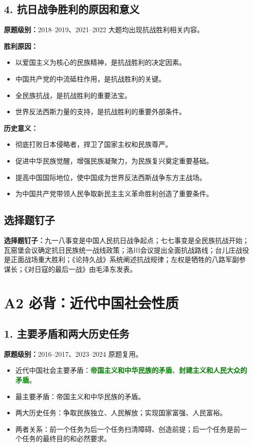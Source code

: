\documentclass[UTF8,zihao=-4]{ctexart}
\newcommand{\exam}[1]{\textcolor{accent}{\bfseries 原题级别：}#1}
\newcommand{\pin}[1]{\textcolor{main}{\bfseries 选择题钉子：}#1}
\newcommand{\core}[1]{\textcolor{green}{\bfseries #1}}
\begin{document}
\subsection{4. 抗日战争胜利的原因和意义}
\exam{2018--2019、2021--2022 大题均出现抗战胜利相关内容。}

\textbf{胜利原因：}
\begin{itemize}
  \item 以爱国主义为核心的民族精神，是抗战胜利的决定因素。
  \item 中国共产党的中流砥柱作用，是抗战胜利的关键。
  \item 全民族抗战，是抗战胜利的重要法宝。
  \item 世界反法西斯力量的支持，是抗战胜利的重要外部条件。
\end{itemize}

\textbf{历史意义：}
\begin{itemize}
  \item 彻底打败日本侵略者，捍卫了国家主权和民族尊严。
  \item 促进中华民族觉醒，增强民族凝聚力，为民族复兴奠定重要基础。
  \item 提高中国国际地位，使中国成为世界反法西斯战争东方主战场。
  \item 为中国共产党带领人民争取新民主主义革命胜利创造了重要条件。
\end{itemize}

\subsection{选择题钉子}
\pin{九一八事变是中国人民抗日战争起点；七七事变是全民族抗战开始；瓦窑堡会议确定抗日民族统一战线政策；洛川会议提出全面抗战路线；台儿庄战役是正面战场重大胜利；《论持久战》系统阐述抗战规律；左权是牺牲的八路军副参谋长；《对日寇的最后一战》由毛泽东发表。}

\newpage

\section{A2 必背：近代中国社会性质}

\subsection{1. 主要矛盾和两大历史任务}
\exam{2016--2017、2023--2024 原题复用。}
\begin{itemize}
  \item 近代中国社会主要矛盾：\core{帝国主义和中华民族的矛盾}、\core{封建主义和人民大众的矛盾}。
  \item 最主要矛盾：帝国主义和中华民族的矛盾。
  \item 两大历史任务：争取民族独立、人民解放；实现国家富强、人民富裕。
  \item 两者关系：前一个任务为后一个任务扫清障碍、创造前提；后一个任务是前一个任务的最终目的和必然要求。
\end{itemize}
\end{document}
